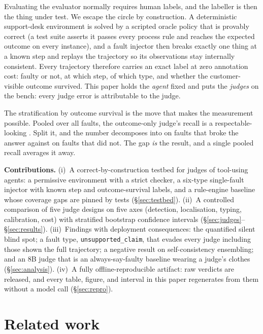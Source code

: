 \documentclass{article}
\newcommand{\ftype}[1]{\texttt{#1}}
\begin{document}
Evaluating the evaluator normally requires human labels, and the labeller is then the thing
under test. We escape the circle by construction. A deterministic support-desk environment is
solved by a scripted oracle policy that is provably correct (a test suite asserts it passes
every process rule and reaches the expected outcome on every instance), and a fault injector
then breaks exactly one thing at a known step and replays the trajectory so its observations
stay internally consistent. Every trajectory therefore carries an exact label at zero
annotation cost: faulty or not, at which step, of which type, and whether the customer-visible
outcome survived. This paper holds the \emph{agent} fixed and puts the \emph{judges} on the
bench: every judge error is attributable to the judge.

The stratification by outcome survival is the move that makes the measurement possible.
Pooled over all faults, the outcome-only judge's recall is a respectable-looking
\tjOutcomePooledRecall{}. Split it, and the number decomposes into \tjOutcomeLoud{} on faults
that broke the answer against \tjOutcomeSilent{} on faults that did not. The gap \emph{is}
the result, and a single pooled recall averages it away.

\textbf{Contributions.}
(i)~A correct-by-construction testbed for judges of tool-using agents: a permissive
environment with a strict checker, a six-type single-fault injector with known step and
outcome-survival labels, and a rule-engine baseline whose coverage gaps are pinned by tests
(\S\ref{sec:testbed}).
(ii)~A controlled comparison of five judge designs on five axes (detection, localisation,
typing, calibration, cost) with stratified bootstrap confidence intervals
(\S\ref{sec:judges}--\S\ref{sec:results}).
(iii)~Findings with deployment consequences: the quantified silent blind spot; a fault type,
\ftype{unsupported\_claim}, that evades every judge including those shown the full
trajectory; a negative result on self-consistency ensembling; and an 8B judge that is an
always-say-faulty baseline wearing a judge's clothes (\S\ref{sec:analysis}).
(iv)~A fully offline-reproducible artifact: raw verdicts are released, and every table,
figure, and interval in this paper regenerates from them without a model call
(\S\ref{sec:repro}).

\section{Related work}
\label{sec:related}
\end{document}
